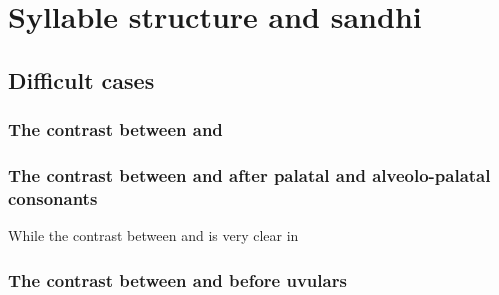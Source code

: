 \chapter{Syllable structure and sandhi} \label{sec:syllable}

\section{Difficult cases}

\subsection{The contrast between  and }

\subsection{The contrast between  and  after palatal and alveolo-palatal consonants}
While the contrast between  and  is very clear in 

\subsection{The contrast between  and  before uvulars}